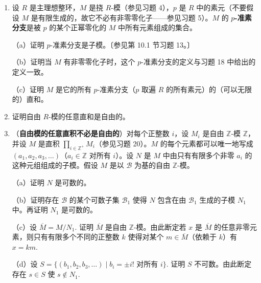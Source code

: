 \begin{enumerate}
（i）由所有 \(N_i\) 生成的 \(M\) 的子模同构于 \(N_i\) 的直和；

（ii）若 \(\{i_1, i_2, \ldots, i_k\}\) 是 \(I\) 的任意有限子集，则 \(N_{i_1} \cap (N_{i_2}+\cdots+N_{i_k}) = 0\)；

（iii）若 \(\{i_1, i_2, \ldots, i_k\}\) 是 \(I\) 的任意有限子集，则 \(N_{i_1}+\cdots+N_{i_k} = N_{i_1} \oplus \cdots \oplus N_{i_k}\)；

（iv）由 \(N_i\) 生成的 \(M\) 的子模的每个元素 \(x\) 都可以用唯一的一族元素 \(a_i \in N_i\)（对所有 \(i \in I\)）表示，其中除有限多个 \(a_i\) 外其余都为零，且 \(x\) 是这些 \(a_i\) 的（有限）和。

\item 设 \(R\) 是主理想整环，\(M\) 是挠 \(R\)-模（参见习题 4），\(p\) 是 \(R\) 中的素元（不要假设 \(M\) 是有限生成的，故它不必有非零零化子——参见习题 5）。\(M\) 的 \textbf{\(p\)-准素分支}是被 \(p\) 的某个正幂零化的 \(M\) 中所有元素组成的集合。

（a）证明 \(p\)-准素分支是子模。〔参见第 10.1 节习题 13。〕

（b）证明当 \(M\) 有非零零化子时，这个 \(p\)-准素分支的定义与习题 18 中给出的定义一致。

（c）证明 \(M\) 是它的所有 \(p\)-准素分支（\(p\) 取遍 \(R\) 的所有素元）的（可以无限的）直和。

\item 证明自由 \(R\)-模的任意直和是自由的。

\item （\textbf{自由模的任意直积不必是自由的}）对每个正整数 \(i\)，设 \(M_i\) 是自由 \(\mathbb{Z}\)-模 \(\mathbb{Z}\)，并设 \(M\) 是直积 \(\prod_{i \in \mathbb{Z}^+} M_i\)（参见习题 20）。\(M\) 的每个元素都可以唯一地写成 \((a_1, a_2, a_3, \ldots)\)（\(a_i \in \mathbb{Z}\) 对所有 \(i\)）。设 \(N\) 是 \(M\) 中由只有有限多个非零 \(a_i\) 的这种元组组成的子模。假设 \(M\) 是以 \(\mathcal{B}\) 为基的自由 \(\mathbb{Z}\)-模。

（a）证明 \(N\) 是可数的。

（b）证明存在 \(\mathcal{B}\) 的某个可数子集 \(\mathcal{B}_1\) 使得 \(N\) 包含在由 \(\mathcal{B}_1\) 生成的子模 \(N_1\) 中。再证明 \(N_1\) 是可数的。

（c）设 \(\overline{M} = M/N_1\). 证明 \(\overline{M}\) 是自由 \(\mathbb{Z}\)-模。由此断定若 \(x\) 是 \(\overline{M}\) 的任意非零元素，则只有有限多个不同的正整数 \(k\) 使得对某个 \(m \in \overline{M}\)（依赖于 \(k\)）有 \(x = km\).

（d）设 \(S = \{(b_1, b_2, b_3, \ldots) \mid b_i = \pm i! \text{ 对所有 } i\}\). 证明 \(S\) 不可数。由此断定存在 \(s \in S\) 使 \(s \notin N_1\).


\end{enumerate}
